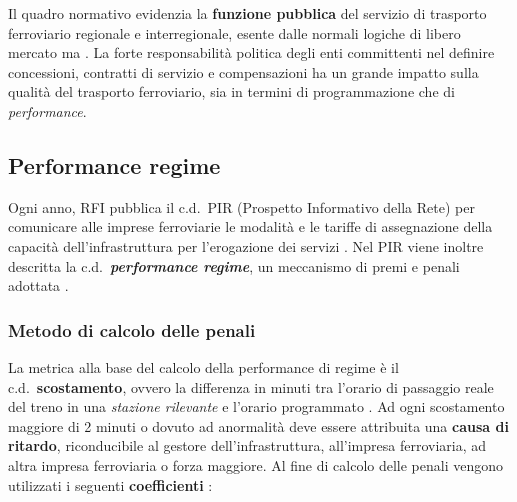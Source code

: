 \documentclass[12pt,italian]{report}
\begin{document}
	Il quadro normativo evidenzia la \textbf{funzione pubblica} del servizio di trasporto ferroviario regionale e interregionale, esente dalle normali logiche di libero mercato ma .
	La forte responsabilità politica degli enti committenti nel definire concessioni, contratti di servizio e compensazioni ha un grande impatto sulla qualità del trasporto ferroviario, sia in termini di programmazione che di \textit{performance}.
	
	\subsection{Performance regime}
	
	Ogni anno, RFI pubblica il c.d.\ PIR (Prospetto Informativo della Rete) per comunicare alle imprese ferroviarie le modalità e le tariffe di assegnazione della capacità dell'infrastruttura per l'erogazione dei servizi \cite{RfiPir}.	
	Nel PIR viene inoltre descritta la c.d.\ \textbf{\textit{performance regime}}, un meccanismo di premi e penali adottata . 
	
	\subsubsection{Metodo di calcolo delle penali}
	La metrica alla base del calcolo della performance di regime è il c.d.\ \textbf{scostamento}, ovvero la differenza in minuti tra l'orario di passaggio reale del treno in una \textit{stazione rilevante} e l'orario programmato \cite[app.\ 5.C, \textit{``Definizioni''}]{RfiPir}.
	Ad ogni scostamento maggiore di 2 minuti o dovuto ad anormalità deve essere attribuita una \textbf{causa di ritardo}, riconducibile al gestore dell'infrastruttura, all'impresa ferroviaria, ad altra impresa ferroviaria o forza maggiore.
	Al fine di calcolo delle penali vengono utilizzati i seguenti \textbf{coefficienti} \cite[app.\ 5.C, \textit{``Metodi di calcolo''}]{RfiPir}:
	
\end{document}
